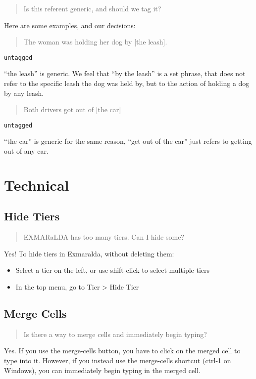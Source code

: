 \documentclass[
]{book}
\providecommand{\tightlist}{%
  \setlength{\itemsep}{0pt}\setlength{\parskip}{0pt}}
\begin{document}
\begin{quote}
Is this referent generic, and should we tag it?
\end{quote}

Here are some examples, and our decisions:

\begin{quote}
The woman was holding her dog by {[}the leash{]}.
\end{quote}

\texttt{untagged}

``the leash'' is generic.
We feel that ``by the leash'' is a set phrase,
that does not refer to the specific leash the dog was held by,
but to the action of holding a dog by any leash.

\begin{quote}
Both drivers got out of {[}the car{]}
\end{quote}

\texttt{untagged}

``the car'' is generic for the same reason,
``get out of the car'' just refers to getting out of any car.

\hypertarget{technical}{%
\section{Technical}\label{technical}}

\hypertarget{hide-tiers}{%
\subsection{Hide Tiers}\label{hide-tiers}}

\begin{quote}
EXMARaLDA has too many tiers. Can I hide some?
\end{quote}

Yes! To hide tiers in Exmaralda, without deleting them:

\begin{itemize}
\tightlist
\item
  Select a tier on the left, or use shift-click to select multiple tiers
\item
  In the top menu, go to Tier \textgreater{} Hide Tier
\end{itemize}

\hypertarget{merge-cells}{%
\subsection{Merge Cells}\label{merge-cells}}

\begin{quote}
Is there a way to merge cells and immediately begin typing?
\end{quote}

Yes.
If you use the merge-cells button, you have to click on the merged cell to type into it.
However, if you instead use the merge-cells shortcut (ctrl-1 on Windows), you can immediately begin typing in the merged cell.
\end{document}
